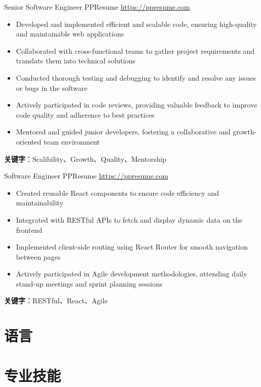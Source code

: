 \documentclass[a4paper, serif, 11pt]{moderncv}
\begin{document}
        {Senior Software Engineer}
        {PPResume}
        {\href{https://ppresume.com}{https://ppresume.com}}
        {}
        {\begin{itemize}
\item Developed and implemented efficient and scalable code, ensuring high-quality and maintainable web applications
\item Collaborated with cross-functional teams to gather project requirements and translate them into technical solutions
\item Conducted thorough testing and debugging to identify and resolve any issues or bugs in the software
\item Actively participated in code reviews, providing valuable feedback to improve code quality and adherence to best practices
\item Mentored and guided junior developers, fostering a collaborative and growth-oriented team environment
\end{itemize}
\textbf{关键字}：Scalibility、Growth、Quality、Mentorship}

        {Software Engineer}
        {PPResume}
        {\href{https://ppresume.com}{https://ppresume.com}}
        {}
        {\begin{itemize}
\item Created reusable React components to ensure code efficiency and maintainability
\item Integrated with RESTful APIs to fetch and display dynamic data on the frontend
\item Implemented client-side routing using React Router for smooth navigation between pages
\item Actively participated in Agile development methodologies, attending daily stand-up meetings and sprint planning sessions
\end{itemize}
\textbf{关键字}：RESTful、React、Agile}

\section{语言}


\section{专业技能}
\end{document}
